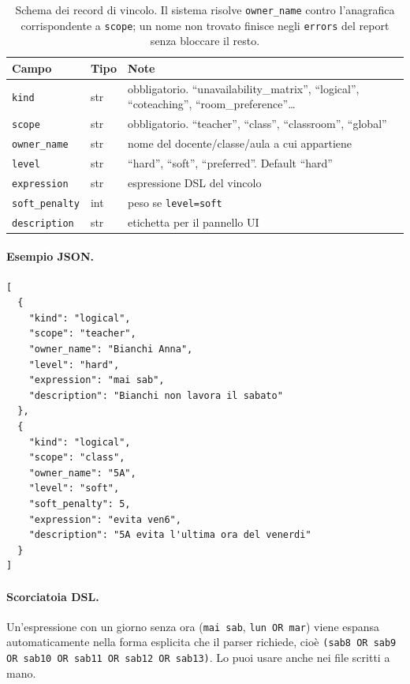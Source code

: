 \begin{table}[h]
\centering\small
\begin{tabular}{l l p{6.2cm}}
\toprule
\textbf{Campo} & \textbf{Tipo} & \textbf{Note} \\
\midrule
\texttt{kind} & str & obbligatorio. ``unavailability\_matrix'', ``logical'', ``coteaching'', ``room\_preference''\dots \\
\texttt{scope} & str & obbligatorio. ``teacher'', ``class'', ``classroom'', ``global'' \\
\texttt{owner\_name} & str & nome del docente/classe/aula a cui appartiene \\
\texttt{level} & str & ``hard'', ``soft'', ``preferred''. Default ``hard'' \\
\texttt{expression} & str & espressione DSL del vincolo \\
\texttt{soft\_penalty} & int & peso se \texttt{level=soft} \\
\texttt{description} & str & etichetta per il pannello UI \\
\bottomrule
\end{tabular}
\caption{Schema dei record di vincolo. Il sistema risolve
\texttt{owner\_name} contro l'anagrafica corrispondente a
\texttt{scope}; un nome non trovato finisce negli \texttt{errors}
del report senza bloccare il resto.}
\label{tab:formato_vincoli}
\end{table}

\paragraph{Esempio JSON.}
\begin{lstlisting}
[
  {
    "kind": "logical",
    "scope": "teacher",
    "owner_name": "Bianchi Anna",
    "level": "hard",
    "expression": "mai sab",
    "description": "Bianchi non lavora il sabato"
  },
  {
    "kind": "logical",
    "scope": "class",
    "owner_name": "5A",
    "level": "soft",
    "soft_penalty": 5,
    "expression": "evita ven6",
    "description": "5A evita l'ultima ora del venerdi"
  }
]
\end{lstlisting}

\paragraph{Scorciatoia DSL.} Un'espressione con un giorno senza ora
(\texttt{mai sab}, \texttt{lun OR mar}) viene espansa automaticamente
nella forma esplicita che il parser richiede, cio\`e
\texttt{(sab8 OR sab9 OR sab10 OR sab11 OR sab12 OR sab13)}. Lo
puoi usare anche nei file scritti a mano.


